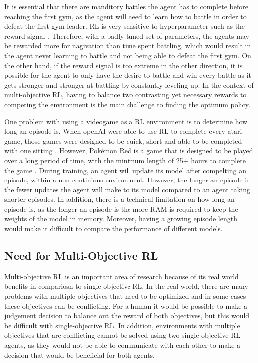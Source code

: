 It is essential that there are manditory battles the agent has to complete before reaching the first gym, as the agent will need to learn how to battle in order to defeat the first gym leader. RL is very sensitive to hyperparameter such as the reward signal \cite{XanderSteenbrugge2019ppo}. Therefore, with a badly tuned set of parameters, the agents may be rewarded more for nagivation than time spent battling, which would result in the agent never learning to battle and not being able to defeat the first gym. On the other hand, if the reward signal is too extreme in the other direction, it is possible for the agent to only have the desire to battle and win every battle as it gets stronger and stronger at battling by constantly leveling up. In the context of multi-objective RL, having to balance two contrasting yet necessary rewards to competing the environment is the main challenge to finding the optimum policy. 

One problem with using a videogame as a RL environment is to determine how long an episode is. When openAI were able to use RL to complete every atari game, those games were designed to be quick, short and able to be completed with one sitting \cite{brockman2016openai}. However, Pokémon Red is a game that is designed to be played over a long period of time, with the minimum length of 25+ hours to complete the game \cite{howlongtobeat}. During training, an agent will update its model after compelting an episode, within a non-continious environment. However, the longer an episode is the fewer updates the agent will make to its model compared to an agent taking shorter episodes. In addition, there is a technical limitation on how long an episode is, as the longer an episode is the more RAM is required to keep the weights of the model in memory. Moreover, having a growing episode length would make it difficult to compare the performance of different models.


\subsection{Need for Multi-Objective RL} 

Multi-objective RL is an important area of research because of its real world benefits in compariosn to single-objective RL. In the real world, there are many problems with multiple objectives that need to be optimized and in some cases these objectives can be conflicting. For a human it would be possible to make a judgement decision to balance out the reward of both objectives, but this would be difficult with single-objective RL. In addition, environments with multiple objectives that are conflicting cannot be solved using two single-objective RL agents, as they would not be able to communicate with each other to make a decision that would be beneficial for both agents. %

